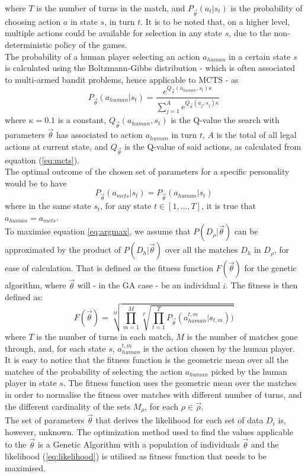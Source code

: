 where $T$ is the number of turns in the match, and $P_{\vec{\theta}}(a_t|s_t)$ is the probability of choosing action $a$ in state $s$, in turn $t$. It is to be noted that, on a higher level, multiple actions could be available for selection in any state $s$, due to the non-deterministic policy of the games. \\
The probability of a human player selecting an action $a_{human}$ in a certain state $s$ is calculated using the Boltzmann-Gibbs distribution - which is often associated to multi-armed bandit problems\cite{coulom2006efficient}, hence applicable to MCTS - as $$P_{\vec{\theta}}(a_{human}|s_t) = \frac{e^{Q_{\vec{\theta}}(a_{human},s_t)\kappa}}{\sum_{j=1}^{A}e^{Q_{\vec{\theta}}(a_j,s_j)\kappa}}$$ where $\kappa=0.1$ is a constant, $Q_{\vec{\theta}}(a_{human}, s_t)$ is the Q-value the search with parameters $\vec{\theta}$ has associated to action $a_{human}$ in turn $t$, $A$ is the total of all legal actions at current state, and $Q_{\vec{\theta}}$ is the Q-value of said actions, as calculated from equation (\ref{eq:mcts}).\\
The optimal outcome of the chosen set of parameters for a specific personality would be to have $$P_{\vec{\theta}}(a_{mcts}|s_t) = P_{\vec{\theta}}(a_{human}|s_t)$$ where  in the same state $s_t$, for any state $t \in [1,\ldots, T]$, it is true that $a_{human}=a_{mcts}$.\\
To maximise equation \ref{eq:argmax}, we assume that $P(D_\rho|\vec{\theta})$ can be approximated by the product of $P(D_h|\vec{\theta})$ over all the matches $D_h$ in $D_\rho$, for ease of calculation. That is defined as the fitness function $F(\vec{\theta})$ for the genetic algorithm,  where $\vec{\theta}$ will - in the GA case - be an individual $i$. The fitness is then defined as: \begin{equation}\label{eq:fitnessfunc}
F(\vec{\theta}) = \sqrt[M]{\prod_{m=1}^{M}\sqrt[T]{\prod_{t=1}^{T}P_{\vec{\theta}}(a_{human}^{t,m}|s_{t,m}))}}
\end{equation} where $T$ is the number of turns in each match, $M$ is the number of matches gone through, and, for each state $s$, $a_{human}^{t,m}$ is the action chosen by the human player. It is easy to notice that the fitness function is the geometric mean over all the matches of the probability of selecting the action $a_{human}$ picked by the human player in state $s$. The fitness function uses the geometric mean over the matches in order to normalise the fitness over matches with different number of turns, and the different cardinality of the sets $M_\rho$, for each $\rho\in\vec{\rho}$.
\\The set of parameters $\vec{\theta}$ that derives the likelihood for each set of data $D_i$ is, however, unknown. The optimization method used to find the values applicable to the $\vec{\theta}$ is a Genetic Algorithm with a population of individuals $\vec{\theta}$ and the likelihood (\ref{eq:likelihood}) is utilised as fitness function that needs to be maximised.\\
